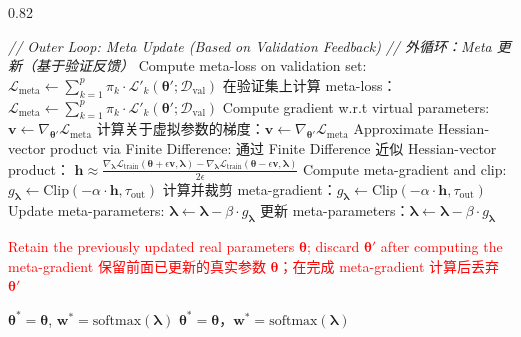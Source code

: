 \documentclass[11pt]{article}
\begin{document}
\begin{algorithm}[!htbp]
\begin{spacing}{0.82}
\begin{algorithmic}[1]
		\State \textit{// Outer Loop: Meta Update (Based on Validation Feedback)}
		\State \textit{// 外循环：Meta 更新（基于验证反馈）}
		\State Compute meta-loss on validation set: $\mathcal{L}_{\text{meta}} \gets \sum_{k=1}^{p} \pi_{k} \cdot \mathcal{L}'_{k}(\boldsymbol{\theta}'; \mathcal{D}_{\text{val}})$
		\State 在验证集上计算 meta-loss：$\mathcal{L}_{\text{meta}} \gets \sum_{k=1}^{p} \pi_{k} \cdot \mathcal{L}'_{k}(\boldsymbol{\theta}'; \mathcal{D}_{\text{val}})$
		\State Compute gradient w.r.t virtual parameters: $\mathbf{v} \gets \nabla_{\boldsymbol{\theta}'} \mathcal{L}_{\text{meta}}$
		\State 计算关于虚拟参数的梯度：$\mathbf{v} \gets \nabla_{\boldsymbol{\theta}'} \mathcal{L}_{\text{meta}}$
		\State Approximate Hessian-vector product via Finite Difference: 
		\State 通过 Finite Difference 近似 Hessian-vector product：
		\Statex \qquad $\mathbf{h} \approx \frac{\nabla_{\boldsymbol{\lambda}} \mathcal{L}_{\text{train}}(\boldsymbol{\theta} + \epsilon \mathbf{v}, \boldsymbol{\lambda}) - \nabla_{\boldsymbol{\lambda}} \mathcal{L}_{\text{train}}(\boldsymbol{\theta} - \epsilon \mathbf{v}, \boldsymbol{\lambda})}{2\epsilon}$
		\State Compute meta-gradient and clip: $g_{\boldsymbol{\lambda}} \gets \text{Clip}(-\alpha \cdot \mathbf{h}, \tau_{\text{out}})$
		\State 计算并裁剪 meta-gradient：$g_{\boldsymbol{\lambda}} \gets \text{Clip}(-\alpha \cdot \mathbf{h}, \tau_{\text{out}})$
		\State Update meta-parameters: $\boldsymbol{\lambda} \gets \boldsymbol{\lambda} - \beta \cdot g_{\boldsymbol{\lambda}}$
		\State 更新 meta-parameters：$\boldsymbol{\lambda} \gets \boldsymbol{\lambda} - \beta \cdot g_{\boldsymbol{\lambda}}$
		
		\State \textcolor{red}{Retain the previously updated real parameters $\boldsymbol{\theta}$; discard $\boldsymbol{\theta}'$ after computing the meta-gradient}
		\State \textcolor{red}{保留前面已更新的真实参数 $\boldsymbol{\theta}$；在完成 meta-gradient 计算后丢弃 $\boldsymbol{\theta}'$}
		\EndFor
		
		\State \Return $\boldsymbol{\theta}^* = \boldsymbol{\theta}$, $\mathbf{w}^* = \text{softmax}(\boldsymbol{\lambda})$
		\State \Return $\boldsymbol{\theta}^* = \boldsymbol{\theta}$，$\mathbf{w}^* = \text{softmax}(\boldsymbol{\lambda})$
	\end{algorithmic}
\end{spacing}
\end{algorithm}
\end{document}
